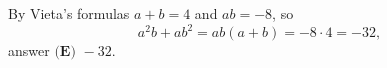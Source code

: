 By Vieta's formulas $a+b=4$ and $ab=-8$, so
\[a^2b+ab^2=ab(a+b)=-8\cdot4=-32,\]
answer $\boxed{\textbf{(E) }-32}$.
